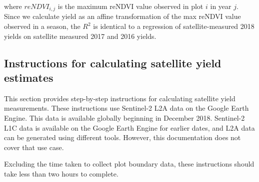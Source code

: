 \documentclass{article}
\begin{document}
where $reNDVI_{i, j}$ is the maximum reNDVI value observed in plot $i$ in year $j$. Since we calculate yield as an affine transformation of the max reNDVI value observed in a season, the $R^2$ is identical to a regression of satellite-measured 2018 yields on satellite measured 2017 and 2016 yields. 

\subsection{Instructions for calculating satellite yield estimates}

This section provides step-by-step instructions for calculating satellite yield measurements. These instructions use Sentinel-2 L2A data on the Google Earth Engine. This data is available globally beginning in December 2018. Sentinel-2 L1C data is available on the Google Earth Engine for earlier dates, and L2A data can be generated using different tools. However, this documentation does not cover that use case. 

Excluding the time taken to collect plot boundary data, these instructions should take less than two hours to complete. 
\end{document}
